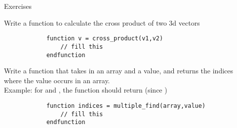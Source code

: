 \documentclass[%
    10pt,
    xcolor={dvipsnames},
    compress, %
]{beamer}
\begin{document}
\begin{frame}[fragile]{Exercises}
    \small
    \vspace{-1em}
    \begin{exercise}
        Write a function to calculate the cross product of two 3d vectors
        \begin{lstlisting}
            function v = cross_product(v1,v2)
                // fill this
            endfunction
        \end{lstlisting}
    \end{exercise}
    \begin{exercise}
        Write a function that takes in an array and a value, and returns the indices where the value occurs in an array.\\
        Example: for  and , the function should return \inlinecode{[2,6]} (since )
        \begin{lstlisting}
            function indices = multiple_find(array,value)
                // fill this
            endfunction
        \end{lstlisting}
    \end{exercise}
\end{frame}
\end{document}
